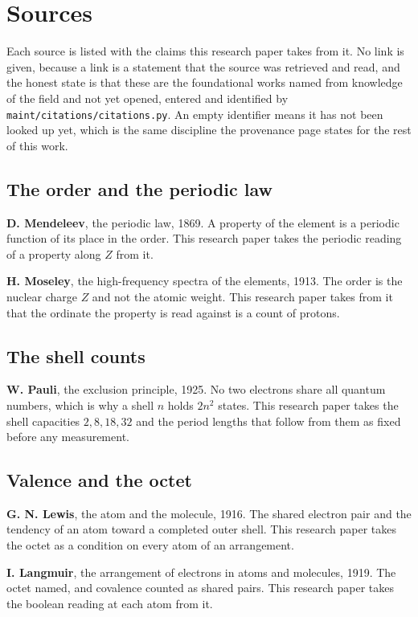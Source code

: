 \chapter{Sources}

Each source is listed with the claims this research paper takes from it. No link is given, because a link is a
statement that the source was retrieved and read, and the honest state is that these are the
foundational works named from knowledge of the field and not yet opened, entered and identified by
\texttt{maint/citations/citations.py}. An empty identifier means it has not been looked up yet, which
is the same discipline the provenance page states for the rest of this work.

\section*{The order and the periodic law}

\textbf{D. Mendeleev}, the periodic law, 1869. A property of the element is a periodic function of its
place in the order. This research paper takes the periodic reading of a property along $Z$ from it.

\textbf{H. Moseley}, the high-frequency spectra of the elements, 1913. The order is the nuclear
charge $Z$ and not the atomic weight. This research paper takes from it that the ordinate the property is read
against is a count of protons.

\section*{The shell counts}

\textbf{W. Pauli}, the exclusion principle, 1925. No two electrons share all quantum numbers, which
is why a shell $n$ holds $2n^2$ states. This research paper takes the shell capacities $2, 8, 18, 32$ and the
period lengths that follow from them as fixed before any measurement.

\section*{Valence and the octet}

\textbf{G. N. Lewis}, the atom and the molecule, 1916. The shared electron pair and the tendency of
an atom toward a completed outer shell. This research paper takes the octet as a condition on every atom of an
arrangement.

\textbf{I. Langmuir}, the arrangement of electrons in atoms and molecules, 1919. The octet named, and
covalence counted as shared pairs. This research paper takes the boolean reading at each atom from it.

